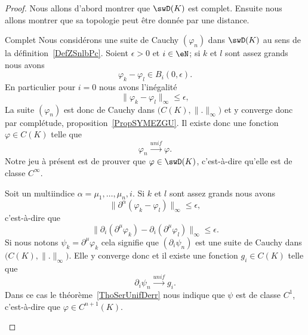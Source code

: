 \begin{proof}

    Nous allons d'abord montrer que \( \swD(K)\) est complet. Ensuite nous allons montrer que sa topologie peut être donnée par une distance.

    \begin{subproof}
        \item[Complet]
            Nous considérons une suite de Cauchy \( (\varphi_n)\) dans \( \swD(K)\) au sens de la définition~\ref{DefZSnlbPc}. Soient \( \epsilon>0\) et \( i\in \eN\); si \( k\) et \( l\) sont assez grands nous avons
            \begin{equation}
                \varphi_k-\varphi_l\in B_i(0,\epsilon).
            \end{equation}
            En particulier pour \( i=0\) nous avons l'inégalité
            \begin{equation}
                \| \varphi_k-\varphi_l \|_{\infty}\leq \epsilon,
            \end{equation}
            La suite \( (\varphi_n)\) est donc de Cauchy dans \( \big( C(K),\| . \|_{\infty} \big)\) et y converge donc par complétude, proposition~\ref{PropSYMEZGU}. Il existe donc une fonction \( \varphi\in C(K)\) telle que
            \begin{equation}
                \varphi_n\stackrel{unif}{\longrightarrow}\varphi.
            \end{equation}
            Notre jeu à présent est de prouver que \( \varphi\in\swD(K)\), c'est-à-dire qu'elle est de classe \(  C^{\infty}\).

            Soit un multiindice \( \alpha=\mu_1,\ldots, \mu_n,i\). Si \( k\) et \( l\) sont assez grands nous avons
            \begin{equation}
                \| \partial^{\alpha}(\varphi_k-\varphi_l) \|_{\infty}\leq \epsilon,
            \end{equation}
            c'est-à-dire que
            \begin{equation}
                \| \partial_i(\partial^{\mu}\varphi_k)-\partial_i(\partial^{\mu}\varphi_l) \|_{\infty}\leq \epsilon.
            \end{equation}
            Si nous notons \( \psi_k=\partial^{\mu}\varphi_k\) cela signifie que \( (\partial_i\psi_n)\) est une suite de Cauchy dans \( \big( C(K),\| . \|_{\infty} \big)\). Elle y converge donc et il existe une fonction \( g_i\in C(K)\) telle que
            \begin{equation}
                \partial_i\psi_n\stackrel{unif}{\longrightarrow}g_i.
            \end{equation}
            Dans ce cas le théorème~\ref{ThoSerUnifDerr} nous indique que \( \psi\) est de classe \( C^1\), c'est-à-dire que \( \varphi\in C^{n+1}(K)\).


\end{subproof}
\end{proof}
